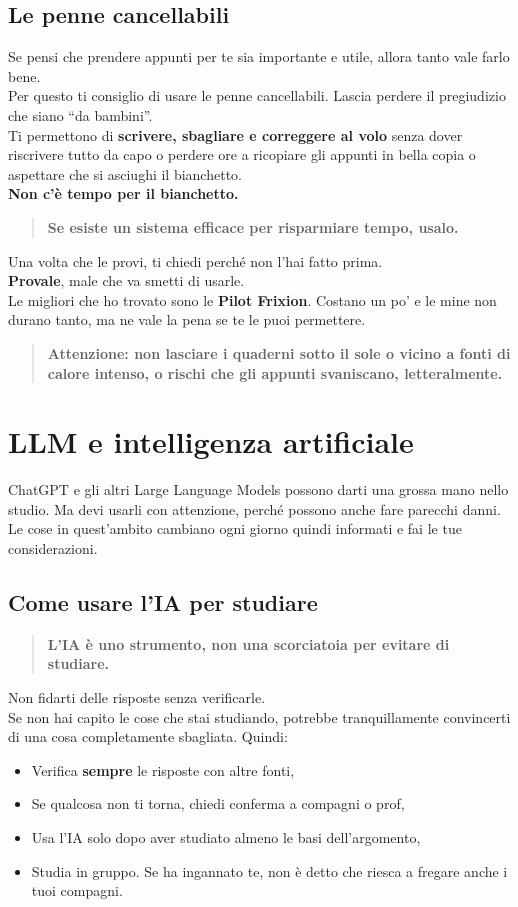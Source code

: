 \documentclass[18pt]{extarticle}
\begin{document}
\subsection{Le penne cancellabili}
Se pensi che prendere appunti per te sia importante e utile, allora tanto vale farlo bene.\\
Per questo ti consiglio di usare le penne cancellabili. Lascia perdere il pregiudizio che siano ``da bambini''.\\
Ti permettono di \textbf{scrivere, sbagliare e correggere al volo} senza dover riscrivere tutto da capo o perdere ore a ricopiare gli appunti in bella copia o aspettare che si asciughi il bianchetto.\\
\textbf{Non c'è tempo per il bianchetto.}
\begin{quote}
\textbf{Se esiste un sistema efficace per risparmiare tempo, usalo.}
\end{quote}
Una volta che le provi, ti chiedi perché non l'hai fatto prima.\\
\textbf{Provale}, male che va smetti di usarle.\\
Le migliori che ho trovato sono le \textbf{Pilot Frixion}. Costano un po' e le mine non durano tanto, ma ne vale la pena se te le puoi permettere.
\begin{quote}
\textbf{Attenzione: non lasciare i quaderni sotto il sole o vicino a fonti di calore intenso, o rischi che gli appunti svaniscano, letteralmente.}
\end{quote}


\section{LLM e intelligenza artificiale}
ChatGPT e gli altri Large Language Models possono darti una grossa mano nello studio. Ma devi usarli con attenzione, perché possono anche fare parecchi danni.\\
Le cose in quest'ambito cambiano ogni giorno quindi informati e fai le tue considerazioni.

\subsection{Come usare l'IA per studiare}
\begin{quote}
\textbf{L'IA è uno strumento, non una scorciatoia per evitare di studiare.}
\end{quote}
Non fidarti delle risposte senza verificarle.\\
Se non hai capito le cose che stai studiando, potrebbe tranquillamente convincerti di una cosa completamente sbagliata. Quindi:
\begin{itemize}
\item Verifica \textbf{sempre} le risposte con altre fonti,
\item Se qualcosa non ti torna, chiedi conferma a compagni o prof,
\item Usa l'IA solo dopo aver studiato almeno le basi dell'argomento,
\item Studia in gruppo. Se ha ingannato te, non è detto che riesca a fregare anche i tuoi compagni.
\end{itemize}
\end{document}
